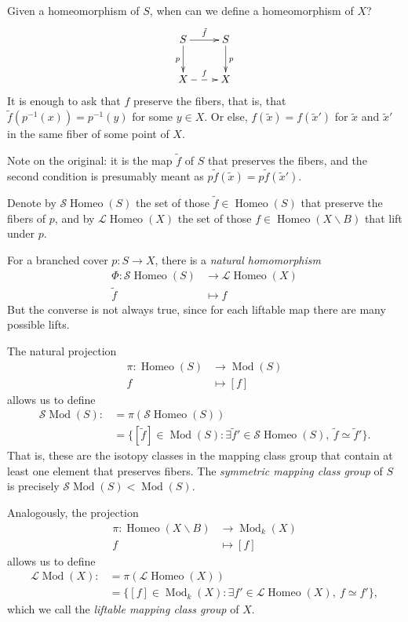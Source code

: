 Given a homeomorphism of $S$, when can
we define a homeomorphism of $X$?
$$
\xymatrix{
S \ar[r]^{\tilde{f}} \ar[d]_{p}
  & S \ar[d]^{p} \\
X \ar@{-->}[r]^{f} & X
}
$$
It is enough to ask that $f$ preserve
the fibers, that is, that
$\tilde{f}(p^{-1}(x))=p^{-1}(y)$ for
some $y\in X$. Or else,
$f(\tilde{x})=f(\tilde{x}')$ for
$\tilde{x}$ and $\tilde{x}'$ in the same
fiber of some point of $X$.

Note on the original: it is the map
$\tilde{f}$ of $S$ that preserves the
fibers, and the second condition is
presumably meant as
$p\tilde{f}(\tilde{x})
=p\tilde{f}(\tilde{x}')$.

Denote by
$\mathcal{S}\operatorname{Homeo}(S)$ the
set of those
$\tilde{f}\in\operatorname{Homeo}(S)$
that preserve the fibers of $p$, and by
$\mathcal{L}\operatorname{Homeo}(X)$ the
set of those
$f\in\operatorname{Homeo}
(X\backslash B)$
that lift under $p$.

\begin{remark}
\label{remark-natural-homomorphism}
For a branched cover $p:S\to X$, there
is a {\it natural homomorphism}
$$
\begin{aligned}
\Phi:\mathcal{S}\operatorname{Homeo}(S)
&\to\mathcal{L}\operatorname{Homeo}(X)\\
\tilde{f}&\mapsto f
\end{aligned}
$$
But the converse is not always true,
since for each liftable map there are
many possible lifts.
\end{remark}

The natural projection
$$
\begin{aligned}
\pi:\operatorname{Homeo}(S)
&\to\operatorname{Mod}(S)\\
f&\mapsto[f]
\end{aligned}
$$
allows us to define
$$
\begin{aligned}
\mathcal{S}\operatorname{Mod}(S)
:&=\pi(\mathcal{S}
\operatorname{Homeo}(S))\\
&=\{[\tilde{f}]\in
\operatorname{Mod}(S):
\exists\tilde{f}'\in
\mathcal{S}\operatorname{Homeo}(S),\
\tilde{f}\simeq\tilde{f}'\}.
\end{aligned}
$$
That is, these are the isotopy classes
in the mapping class group that contain
at least one element that preserves
fibers. The {\it symmetric mapping class
group} of $S$ is precisely
$\mathcal{S}\operatorname{Mod}(S)
<\operatorname{Mod}(S)$.

Analogously, the projection
$$
\begin{aligned}
\pi:\operatorname{Homeo}
(X\backslash B)
&\to\operatorname{Mod}_k(X)\\
f&\mapsto[f]
\end{aligned}
$$
allows us to define
$$
\begin{aligned}
\mathcal{L}\operatorname{Mod}(X)
:&=\pi(\mathcal{L}
\operatorname{Homeo}(X))\\
&=\{[f]\in\operatorname{Mod}_k(X):
\exists f'\in
\mathcal{L}\operatorname{Homeo}(X),\
f\simeq f'\},
\end{aligned}
$$
which we call the {\it liftable mapping
class group} of $X$.

